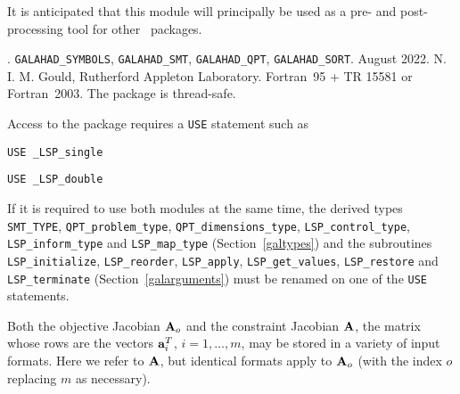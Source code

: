 \documentclass{galahad}
\newcommand{\packagename}{LSP}
\newcommand{\fullpackagename}{\libraryname\_\packagename}
\begin{document}
It is anticipated that this module will principally be used as a pre- and 
post-processing tool for other \galahad\ packages.


\galattributes
\galversions{\tt  \fullpackagename\_single, \fullpackagename\_double}.
\galuses
{\tt GALAHAD\_SY\-M\-BOLS}, 
{\tt GALAHAD\_SMT}, 
{\tt GALAHAD\_QPT},
{\tt GALAHAD\_SORT}.
\galdate August 2022.
\galorigin N. I. M. Gould, Rutherford Appleton Laboratory.
\gallanguage Fortran~95 + TR 15581 or Fortran~2003. 
The package is thread-safe.


\galhowto


Access to the package requires a {\tt USE} statement such as

\medskip{}

\hspace{8mm} {\tt USE \fullpackagename\_single}

\medskip{}

\hspace{8mm} {\tt USE  \fullpackagename\_double}

\medskip

\noindent
If it is required to use both modules at the same time, the derived types 
{\tt SMT\_TYPE},
{\tt QPT\_problem\_type},
{\tt QPT\_dimensions\_type}, 
{\tt \packagename\_control\_type}, 
\sloppy
{\tt \packagename\_inform\_type} 
and
{\tt \packagename\_map\_type}
(Section~\ref{galtypes})
and the subroutines
{\tt \packagename\_initialize}, 
{\tt \packagename\_reorder},
{\tt \packagename\_apply}, 
{\tt \packagename\_get\_values}, 
{\tt \packagename\_restore}
and
{\tt \packagename\_terminate} 
(Section~\ref{galarguments})
must be renamed on one of the {\tt USE} statements.


\galmatrix

Both the objective Jacobian ${\mathbf{A}}_o$ and
the constraint Jacobian ${\mathbf{A}}$, the matrix 
whose rows are the vectors ${\mathbf{a}}_{i}^{T}$, $i = 1, \ldots , m$, 
may be stored in a variety of input formats. Here we refer to ${\mathbf{A}}$, but
identical formats apply to ${\mathbf{A}}_o$ (with the index $o$ replacing $m$ as
necessary).
\end{document}
